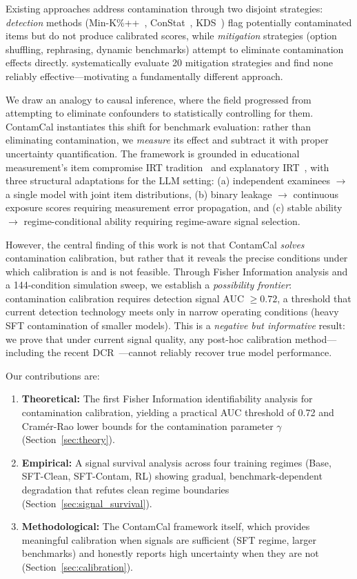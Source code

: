 \documentclass[letterpaper,11pt]{article}
\begin{document}
Existing approaches address contamination through two disjoint strategies: \emph{detection} methods (Min-K\%++~\citep{shi2024detecting}, ConStat~\citep{dekoninck2024constat}, KDS~\citep{dong2024generalization}) flag potentially contaminated items but do not produce calibrated scores, while \emph{mitigation} strategies (option shuffling, rephrasing, dynamic benchmarks) attempt to eliminate contamination effects directly.
\citet{xu2024benchmark} systematically evaluate 20 mitigation strategies and find none reliably effective---motivating a fundamentally different approach.

We draw an analogy to causal inference, where the field progressed from attempting to eliminate confounders to statistically controlling for them.
ContamCal instantiates this shift for benchmark evaluation: rather than eliminating contamination, we \emph{measure} its effect and subtract it with proper uncertainty quantification.
The framework is grounded in educational measurement's item compromise IRT tradition~\citep{eckerly2017detecting,sinharay2017simultaneous} and explanatory IRT~\citep{deboeck2004explanatory}, with three structural adaptations for the LLM setting: (a) independent examinees $\to$ a single model with joint item distributions, (b) binary leakage $\to$ continuous exposure scores requiring measurement error propagation, and (c) stable ability $\to$ regime-conditional ability requiring regime-aware signal selection.

However, the central finding of this work is not that ContamCal \emph{solves} contamination calibration, but rather that it reveals the precise conditions under which calibration is and is not feasible.
Through Fisher Information analysis and a 144-condition simulation sweep, we establish a \emph{possibility frontier}: contamination calibration requires detection signal AUC $\geq 0.72$, a threshold that current detection technology meets only in narrow operating conditions (heavy SFT contamination of smaller models).
This is a \emph{negative but informative} result: we prove that under current signal quality, any post-hoc calibration method---including the recent DCR~\citep{yang2023dcr}---cannot reliably recover true model performance.

Our contributions are:
\begin{enumerate}
\item \textbf{Theoretical:} The first Fisher Information identifiability analysis for contamination calibration, yielding a practical AUC threshold of 0.72 and Cram\'er-Rao lower bounds for the contamination parameter $\gamma$ (Section~\ref{sec:theory}).
\item \textbf{Empirical:} A signal survival analysis across four training regimes (Base, SFT-Clean, SFT-Contam, RL) showing gradual, benchmark-dependent degradation that refutes clean regime boundaries (Section~\ref{sec:signal_survival}).
\item \textbf{Methodological:} The ContamCal framework itself, which provides meaningful calibration when signals are sufficient (SFT regime, larger benchmarks) and honestly reports high uncertainty when they are not (Section~\ref{sec:calibration}).
\end{enumerate}
\end{document}
